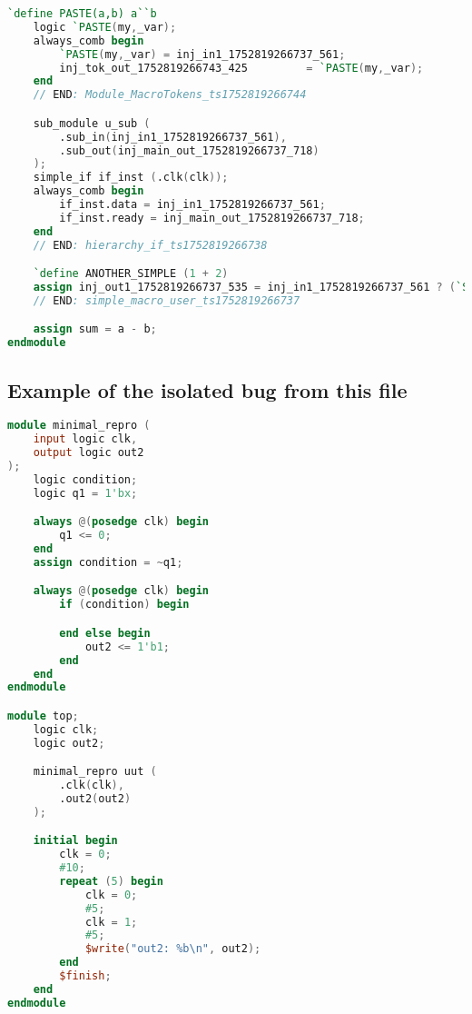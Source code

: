 \begin{lstlisting}[language=Verilog]
    `define PASTE(a,b) a``b
    logic `PASTE(my,_var);
    always_comb begin
        `PASTE(my,_var) = inj_in1_1752819266737_561;
        inj_tok_out_1752819266743_425         = `PASTE(my,_var);
    end
    // END: Module_MacroTokens_ts1752819266744

    sub_module u_sub (
        .sub_in(inj_in1_1752819266737_561),
        .sub_out(inj_main_out_1752819266737_718)
    );
    simple_if if_inst (.clk(clk));
    always_comb begin
        if_inst.data = inj_in1_1752819266737_561;
        if_inst.ready = inj_main_out_1752819266737_718;
    end
    // END: hierarchy_if_ts1752819266738

    `define ANOTHER_SIMPLE (1 + 2)
    assign inj_out1_1752819266737_535 = inj_in1_1752819266737_561 ? (`SIMPLE_VALUE + `ANOTHER_SIMPLE) : 32'd0;
    // END: simple_macro_user_ts1752819266737

    assign sum = a - b;
endmodule

\end{lstlisting}

\subsection*{Example of the isolated bug from this file}
\begin{lstlisting}[language=Verilog]
module minimal_repro (
    input logic clk,
    output logic out2
);
    logic condition;
    logic q1 = 1'bx;

    always @(posedge clk) begin
        q1 <= 0;
    end
    assign condition = ~q1;

    always @(posedge clk) begin
        if (condition) begin

        end else begin
            out2 <= 1'b1;
        end
    end
endmodule

module top;
    logic clk;
    logic out2;

    minimal_repro uut (
        .clk(clk),
        .out2(out2)
    );

    initial begin
        clk = 0;
        #10;
        repeat (5) begin
            clk = 0;
            #5;
            clk = 1;
            #5;
            $write("out2: %b\n", out2);
        end
        $finish;
    end
endmodule
\end{lstlisting}
